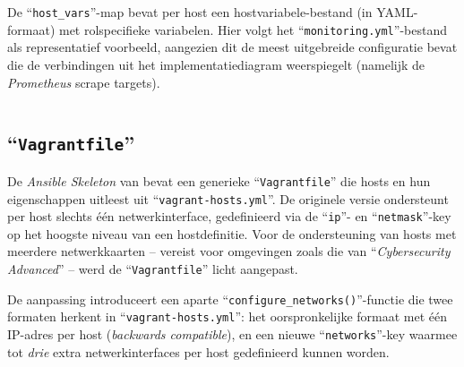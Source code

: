 De ``\texttt{host\_vars}''-map bevat per host een hostvariabele-bestand (in YAML-formaat) met rolspecifieke variabelen. Hier volgt het ``\texttt{monitoring.yml}''-bestand als representatief voorbeeld, aangezien dit de meest uitgebreide configuratie bevat die de verbindingen uit het implementatiediagram weerspiegelt (namelijk de \emph{Prometheus} scrape targets).

\begin{codeblockfixed}
    \begin{codeblock}
        \inputminted{yaml}{../project_files/manual_test_env/ansible/host_vars/monitoring.yml}
        \caption[``\texttt{host\_vars/monitoring.yml}'' van de manuele testomgeving]{``\texttt{host\_vars/monitoring.yml}'' van de manuele testomgeving; bevat de \emph{Prometheus}- en \emph{Grafana}-configuratie voor de monitoringserver.}
        \label{code:monitoring.yml}
    \end{codeblock}
\end{codeblockfixed}

\subsection{``\texttt{Vagrantfile}''}%
\label{sec:vagrantfile_multiple_networks}

De \emph{Ansible Skeleton} van \textcite{Vreckem2025} bevat een generieke ``\texttt{Vagrantfile}'' die hosts en hun eigenschappen uitleest uit ``\texttt{vagrant-hosts.yml}''. De originele versie ondersteunt per host slechts één netwerkinterface, gedefinieerd via de ``\texttt{ip}''- en ``\texttt{netmask}''-key op het hoogste niveau van een hostdefinitie.
Voor de ondersteuning van hosts met meerdere netwerkkaarten -- vereist voor omgevingen zoals die van ``\emph{Cybersecurity Advanced}'' -- werd de ``\texttt{Vagrantfile}'' licht aangepast.

De aanpassing introduceert een aparte ``\texttt{configure\_networks()}''-functie die twee formaten herkent in ``\texttt{vagrant-hosts.yml}'': het oorspronkelijke formaat met één IP-adres per host (\emph{backwards compatible}), en een nieuwe ``\texttt{networks}''-key waarmee tot \emph{drie} extra netwerkinterfaces per host gedefinieerd kunnen worden.

